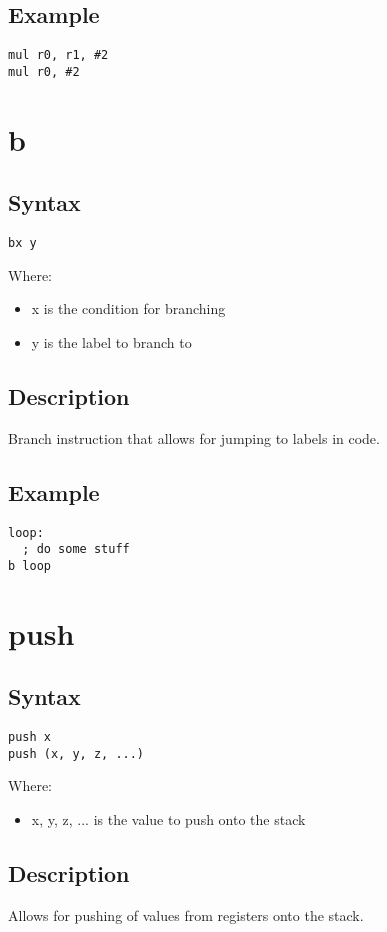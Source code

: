 \documentclass[11pt]{scrartcl}
\begin{document}
\subsection{Example}
\begin{verbatim}
mul r0, r1, #2
mul r0, #2
\end{verbatim}

\section{b}
\subsection{Syntax}
\begin{verbatim}
bx y
\end{verbatim}
Where:
\begin{itemize}
    \item x is the condition for branching
    \item y is the label to branch to
\end{itemize}
\subsection{Description}
Branch instruction that allows for jumping to labels in code.
\subsection{Example}
\begin{verbatim}
loop:
  ; do some stuff
b loop
\end{verbatim}

\section{push}
\subsection{Syntax}
\begin{verbatim}
push x
push (x, y, z, ...)
\end{verbatim}
Where:
\begin{itemize}
    \item x, y, z, ... is the value to push onto the stack
\end{itemize}
\subsection{Description}
Allows for pushing of values from registers onto the stack.
\end{document}
